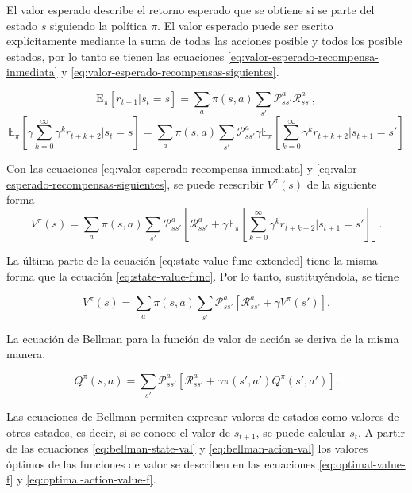 El valor esperado describe el retorno esperado que se obtiene si se parte del estado $s$ siguiendo la política $\pi$.
El valor esperado puede ser escrito explícitamente mediante la suma de todas
las acciones posible y todos los posible estados, por lo tanto se tienen las ecuaciones
\ref{eq:valor-esperado-recompensa-inmediata} y \ref{eq:valor-esperado-recompensas-siguientes}.

\begin{equation}
\label{eq:valor-esperado-recompensa-inmediata}
\mathrm{E}_\pi[r_{t+1}| s_t=s] = \sum_a \pi(s,a) \sum_{s'}\mathcal{P}_{ss'}^a\mathcal{R}_{ss'}^a,    
\end{equation}
\begin{equation}
\label{eq:valor-esperado-recompensas-siguientes}
\mathbb{E}_\pi[\gamma \sum_{k = 0}^\infty \gamma^{k} r_{t+k+2} | s_t =s] =
\sum_a \pi(s,a) \sum_{s'}\mathcal{P}_{ss'}^a \gamma \mathbb{E}_\pi[\sum_{k = 0}^\infty \gamma^{k} r_{t+k+2} | s_{t+1} = s']    
\end{equation}


Con las ecuaciones \ref{eq:valor-esperado-recompensa-inmediata} y \ref{eq:valor-esperado-recompensas-siguientes}, se puede reescribir $V^\pi(s)$ de la
siguiente forma
\begin{equation}
\label{eq:state-value-func-extended}
V^\pi(s) = \sum_a \pi(s,a) \sum_{s'}\mathcal{P}_{ss'}^a [\mathcal{R}_{ss'}^a +
\gamma \mathbb{E}_\pi[\sum_{k = 0}^\infty \gamma^{k} r_{t+k+2} | s_{t+1} = s']].
\end{equation}

La última parte de la ecuación \ref{eq:state-value-func-extended} tiene
la misma forma que la ecuación \ref{eq:state-value-func}. Por lo tanto, sustituyéndola, se tiene

\begin{equation}\label{eq:bellman-state-val}
    V^\pi(s) = \sum_a \pi(s,a) \sum_{s'}\mathcal{P}_{ss'}^a [\mathcal{R}_{ss'}^a + \gamma V^\pi(s')].
\end{equation}

La ecuación de Bellman para la función de valor de acción se deriva de la misma manera.

\begin{equation}\label{eq:bellman-acion-val}
    Q^\pi(s, a) = \sum_{s'}\mathcal{P}_{ss'}^a [\mathcal{R}_{ss'}^a + \gamma \pi(s',a')Q^\pi(s', a')].
\end{equation}

Las ecuaciones de Bellman permiten expresar valores de estados como
valores de otros estados, es decir, si se conoce el valor de $s_{t+1}$, se puede calcular $s_t$. A partir de las ecuaciones \ref{eq:bellman-state-val} y \ref{eq:bellman-acion-val} los valores óptimos de
las funciones de valor se describen en las ecuaciones \ref{eq:optimal-value-f} y \ref{eq:optimal-action-value-f}.

